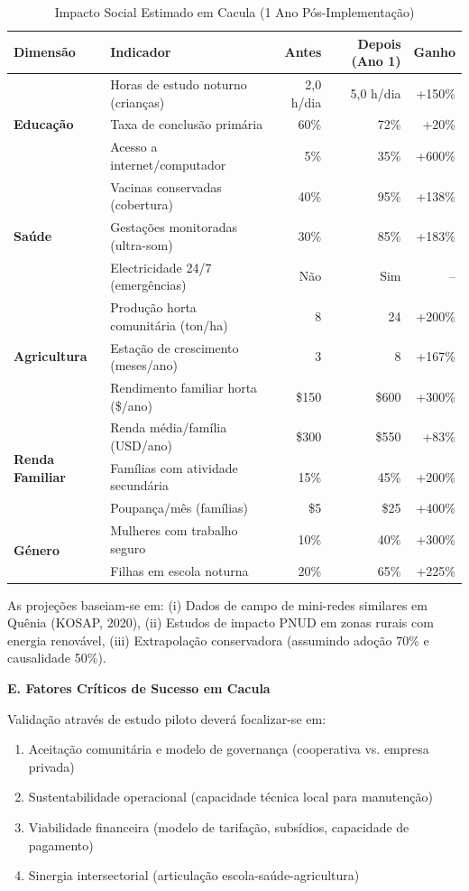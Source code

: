 \documentclass[12pt, a4paper]{article}
\begin{document}
\begin{table}[H]
\centering
\caption{Impacto Social Estimado em Cacula (1 Ano Pós-Implementação)}
\label{tab:cacula_impact}
\small
\begin{tabular}{|l|l|r|r|r|}
\hline
\textbf{Dimensão} & \textbf{Indicador} & \textbf{Antes} & \textbf{Depois (Ano 1)} & \textbf{Ganho} \\
\hline
\multirow{3}{*}{\textbf{Educação}} 
  & Horas de estudo noturno (crianças) & 2,0 h/dia & 5,0 h/dia & +150\% \\
  & Taxa de conclusão primária & 60\% & 72\% & +20\% \\
  & Acesso a internet/computador & 5\% & 35\% & +600\% \\
\hline
\multirow{3}{*}{\textbf{Saúde}}
  & Vacinas conservadas (cobertura) & 40\% & 95\% & +138\% \\
  & Gestações monitoradas (ultra-som) & 30\% & 85\% & +183\% \\
  & Electricidade 24/7 (emergências) & Não & Sim & -- \\
\hline
\multirow{3}{*}{\textbf{Agricultura}}
  & Produção horta comunitária (ton/ha) & 8 & 24 & +200\% \\
  & Estação de crescimento (meses/ano) & 3 & 8 & +167\% \\
  & Rendimento familiar horta (\$/ano) & \$150 & \$600 & +300\% \\
\hline
\multirow{3}{*}{\textbf{Renda Familiar}}
  & Renda média/família (USD/ano) & \$300 & \$550 & +83\% \\
  & Famílias com atividade secundária & 15\% & 45\% & +200\% \\
  & Poupança/mês (famílias) & \$5 & \$25 & +400\% \\
\hline
\multirow{2}{*}{\textbf{Género}}
  & Mulheres com trabalho seguro & 10\% & 40\% & +300\% \\
  & Filhas em escola noturna & 20\% & 65\% & +225\% \\
\hline
\end{tabular}
\end{table}

As projeções baseiam-se em: (i) Dados de campo de mini-redes similares em Quênia 
(KOSAP, 2020), (ii) Estudos de impacto PNUD em zonas rurais com energia renovável, 
(iii) Extrapolação conservadora (assumindo adoção 70\% e causalidade 50\%).

\textbf{E. Fatores Críticos de Sucesso em Cacula}

Validação através de estudo piloto deverá focalizar-se em:
\begin{enumerate}
\item Aceitação comunitária e modelo de governança (cooperativa vs. empresa privada)
\item Sustentabilidade operacional (capacidade técnica local para manutenção)
\item Viabilidade financeira (modelo de tarifação, subsídios, capacidade de pagamento)
\item Sinergia intersectorial (articulação escola-saúde-agricultura)
\end{enumerate}
\end{document}
